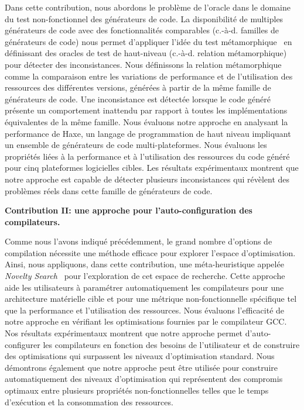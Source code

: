 Dans cette contribution, nous abordons le probl\`eme de l'oracle dans le domaine du test  non-fonctionnel des g\'en\'erateurs de code. La disponibilit\'e de multiples g\'en\'erateurs de code avec des fonctionnalit\'es comparables (c.-\`a-d. familles de g\'en\'erateurs de code) nous permet d'appliquer l'id\'ee du test m\'etamorphique~\cite{zhou2004metamorphic} en d\'efinissant des oracles de test de haut-niveau (c.-\`a-d. relation m\'etamorphique) pour d\'etecter des inconsistances. Nous d\'efinissons la relation m\'etamorphique comme la comparaison entre les variations de performance et de l'utilisation des ressources des diff\'erentes versions, g\'en\'er\'ees \`a partir de la m\^eme famille de g\'en\'erateurs de code. Une inconsistance est d\'etect\'ee lorsque le code g\'en\'er\'e pr\'esente un comportement inattendu par rapport \`a toutes les impl\'ementations \'equivalentes de la m\^eme famille.
Nous \'evaluons notre approche en analysant la performance de Haxe, un langage de programmation de haut niveau impliquant un ensemble de g\'en\'erateurs de code multi-plateformes. Nous \'evaluons les propri\'et\'es li\'ees \`a la performance et \`a l'utilisation des ressources du code g\'en\'er\'e pour cinq plateformes logicielles cibles. Les r\'esultats exp\'erimentaux montrent que notre approche est capable de d\'etecter plusieurs inconsistances qui r\'ev\`elent des probl\`emes r\'eels dans cette famille de g\'en\'erateurs de code.  

\textbf{Contribution II: une approche pour l'auto-configuration des compilateurs. }

Comme nous l'avons indiqu\'e pr\'ec\'edemment, le grand nombre d'options de compilation n\'ecessite une m\'ethode efficace pour explorer l'espace d'optimisation. Ainsi, nous appliquons, dans cette contribution, une m\'eta-heuristique appel\'ee \textit{Novelty Search}~\cite{lehman2008exploiting} pour l'exploration de cet espace de recherche. Cette approche aide les utilisateurs \`a param\'etrer automatiquement les compilateurs pour une architecture mat\'erielle cible et pour une m\'etrique non-fonctionnelle sp\'ecifique tel que la performance et l'utilisation des ressources. Nous \'evaluons l'efficacit\'e de notre approche en v\'erifiant les optimisations fournies par le compilateur GCC. Nos r\'esultats exp\'erimentaux montrent que notre approche permet d'auto-configurer les compilateurs en fonction des besoins de l'utilisateur et de construire des optimisations qui surpassent les niveaux d'optimisation standard. Nous d\'emontrons \'egalement que notre approche peut \^etre utilis\'ee pour construire automatiquement des niveaux d'optimisation qui repr\'esentent des compromis optimaux entre plusieurs propri\'et\'es non-fonctionnelles telles que le temps d'ex\'ecution et la consommation des ressources.  

